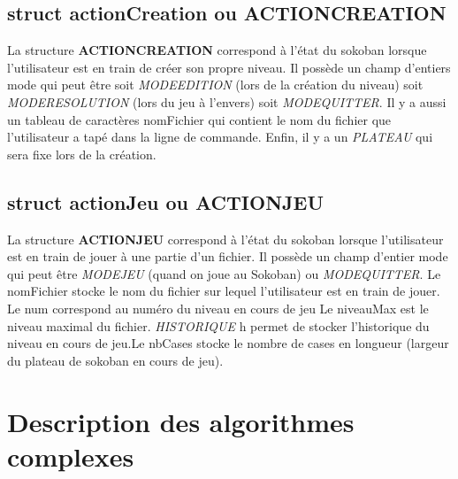 \documentclass[a4]{article}
\begin{document}
\subsection{struct actionCreation ou ACTIONCREATION}
La structure \textbf{ACTIONCREATION} correspond à l'état du sokoban lorsque l'utilisateur est en train de créer son propre niveau. 
Il possède un champ d'entiers mode qui peut être soit \emph{MODE\textunderscore EDITION} (lors de la création du niveau) soit \emph{MODE\textunderscore RESOLUTION} (lors du jeu à l'envers) soit \emph{MODE\textunderscore QUITTER}. 
Il y a aussi un tableau de caractères nomFichier qui contient le nom du fichier que l'utilisateur a tapé dans la ligne de commande. 
Enfin, il y a un \textit{PLATEAU} qui sera fixe lors de la création.

\subsection{struct actionJeu ou ACTIONJEU}
La structure \textbf{ACTIONJEU} correspond à l'état du sokoban lorsque l'utilisateur est en train de jouer à une partie d'un fichier.
Il possède un champ d'entier mode qui peut être \emph{MODE\textunderscore JEU} (quand on joue au Sokoban) ou \emph{MODE\textunderscore QUITTER}.
Le nomFichier stocke le nom du fichier sur lequel l'utilisateur est en train de jouer. 
Le num correspond au numéro du niveau en cours de jeu
Le niveauMax est le niveau maximal du fichier. 
\textit{HISTORIQUE} h permet de stocker l'historique du niveau en cours de jeu.Le nbCases stocke le nombre de cases en longueur (largeur du plateau de sokoban en cours de jeu).


\section{Description des algorithmes complexes}
\end{document}
